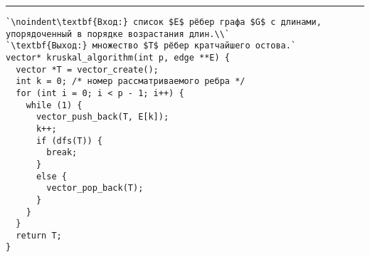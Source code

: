 \documentclass[11pt,b5paper,twoside,openany]{book}
\begin{document}
\vspace{5pt} \hrule
\begin{lstlisting}[caption={Алгоритм Краскала}, label=p329_kruskal, escapechar=`]
`\noindent\textbf{Вход:} список $E$ рёбер графа $G$ с длинами, упорядоченный в порядке возрастания длин.\\`
`\textbf{Выход:} множество $T$ рёбер кратчайшего остова.`
vector* kruskal_algorithm(int p, edge **E) {
  vector *T = vector_create();
  int k = 0; /* номер рассматриваемого ребра */
  for (int i = 0; i < p - 1; i++) {
    while (1) {
      vector_push_back(T, E[k]);
      k++;
      if (dfs(T)) {
        break;
      }
      else {
        vector_pop_back(T);
      }
    }
  }
  return T;
}
\end{lstlisting}
\end{document}
